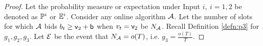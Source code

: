 \begin{proof}




%
%
%
% 

Let the probability measure or expectation under Input $i, \ i=1,2$ be denoted as ${\mathbb{P}}^i$ or ${\mathbb{E}}^i$.
Consider any online algorithm $\mathcal{A}$. Let the number of slots for which $\mathcal{A}$ bids $b_t \ge {\mathsf{v}}_2+{\mathsf{b}}$ when $v_t = {\mathsf{v}}_2$ be $N_{\mathcal{A}}$. Recall Definition \ref{defn:p3} for $g_1,g_2, g_3$. Let $\mathcal{E}$ be the event that $N_{\mathcal{A}} = o(T)$, i.e. $g_3=\frac{o(T)}{T}$.



\end{proof}
